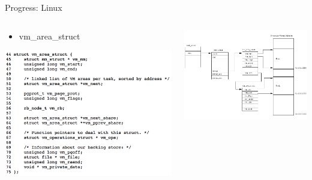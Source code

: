 \documentclass[aspectratio=169]{beamer}
\newcommand{\bi}{\begin{itemize}}
\newcommand{\ei}{\end{itemize}}
\begin{document}
\begin{frame}{Progress: Linux}
  \begin{columns}[T]
    \begin{column}{0.4\textwidth}
      \bi
    \item vm\_area\_struct
      \ei
      \includegraphics[scale=0.35]{./figures/linux3.png}
    \end{column}
    \begin{column}{0.6\textwidth}
      \includegraphics[scale=0.35]{./figures/linux1.png}
    \end{column}
  \end{columns}
\end{frame}
\end{document}
